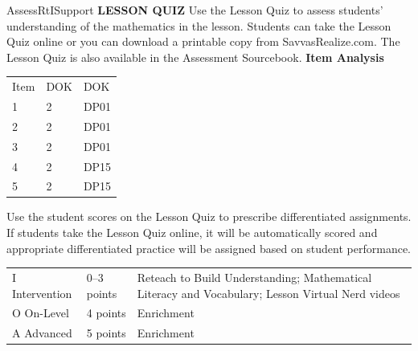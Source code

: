\documentclass{article}
\newenvironment{te-addendum}[2]{}{}     %
\newcommand{\te}[1]{}                   %
\begin{document}
\begin{te-addendum}{Assess}{RtISupport}
\textbf{LESSON QUIZ}
Use the Lesson Quiz to assess students' understanding of the mathematics in the lesson.
Students can take the Lesson Quiz online or you can download a printable copy from SavvasRealize.com. The Lesson Quiz is also available in the Assessment Sourcebook.
\textbf{Item Analysis}
\begin{tabular}{lll}
Item & DOK & DOK \\
1 & 2 & DP01 \\
2 & 2 & DP01 \\
3 & 2 & DP01 \\
4 & 2 & DP15 \\
5 & 2 & DP15 \\
\end{tabular}
\te{Printed third heading DOK; this column contains Skills Review and Practice codes.}
Use the student scores on the Lesson Quiz to prescribe differentiated assignments.
If students take the Lesson Quiz online, it will be automatically scored and appropriate differentiated practice will be assigned based on student performance.
\begin{tabular}{lll}
I Intervention & 0--3 points & Reteach to Build Understanding; Mathematical Literacy and Vocabulary; Lesson Virtual Nerd videos \\
O On-Level & 4 points & Enrichment \\
A Advanced & 5 points & Enrichment \\
\end{tabular}
\end{te-addendum}
\end{document}
